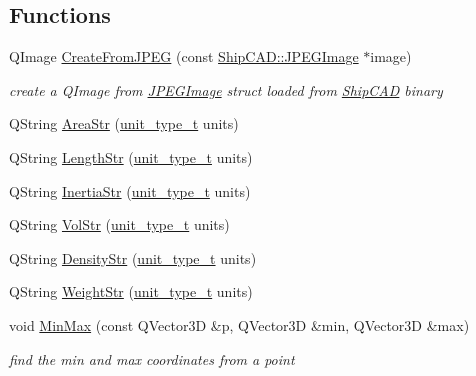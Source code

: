 \subsection*{Functions}
\begin{DoxyCompactItemize}
\item 
Q\+Image \hyperlink{namespaceShipCAD_a31499c415c63299daeef4a846909daae}{Create\+From\+J\+P\+EG} (const \hyperlink{structShipCAD_1_1JPEGImage}{Ship\+C\+A\+D\+::\+J\+P\+E\+G\+Image} $\ast$image)
\begin{DoxyCompactList}\small\item\em create a Q\+Image from \hyperlink{structShipCAD_1_1JPEGImage}{J\+P\+E\+G\+Image} struct loaded from \hyperlink{namespaceShipCAD}{Ship\+C\+AD} binary \end{DoxyCompactList}\item 
Q\+String \hyperlink{namespaceShipCAD_a2d7cf2fbcca4bd1dd75fd9ceb4ff0fa9}{Area\+Str} (\hyperlink{namespaceShipCAD_ac6a7a28b4b063771afae92decb602da5}{unit\+\_\+type\+\_\+t} units)
\item 
Q\+String \hyperlink{namespaceShipCAD_aef3e2265fc686fbe6b50b081dcc4e6ff}{Length\+Str} (\hyperlink{namespaceShipCAD_ac6a7a28b4b063771afae92decb602da5}{unit\+\_\+type\+\_\+t} units)
\item 
Q\+String \hyperlink{namespaceShipCAD_a01d1e42109b5645919c004f6d7a30b68}{Inertia\+Str} (\hyperlink{namespaceShipCAD_ac6a7a28b4b063771afae92decb602da5}{unit\+\_\+type\+\_\+t} units)
\item 
Q\+String \hyperlink{namespaceShipCAD_a0758fd8275aafe6ad813d2a361281bf2}{Vol\+Str} (\hyperlink{namespaceShipCAD_ac6a7a28b4b063771afae92decb602da5}{unit\+\_\+type\+\_\+t} units)
\item 
Q\+String \hyperlink{namespaceShipCAD_af977e4008c66d1a323d105f27622991b}{Density\+Str} (\hyperlink{namespaceShipCAD_ac6a7a28b4b063771afae92decb602da5}{unit\+\_\+type\+\_\+t} units)
\item 
Q\+String \hyperlink{namespaceShipCAD_a62749df66958d1389c3cc6f6f03d42fb}{Weight\+Str} (\hyperlink{namespaceShipCAD_ac6a7a28b4b063771afae92decb602da5}{unit\+\_\+type\+\_\+t} units)
\item 
void \hyperlink{namespaceShipCAD_aa5d3fc63603d716d3e24244049e1e510}{Min\+Max} (const Q\+Vector3D \&p, Q\+Vector3D \&min, Q\+Vector3D \&max)
\begin{DoxyCompactList}\small\item\em find the min and max coordinates from a point \end{DoxyCompactList}\item 

\end{DoxyCompactItemize}
